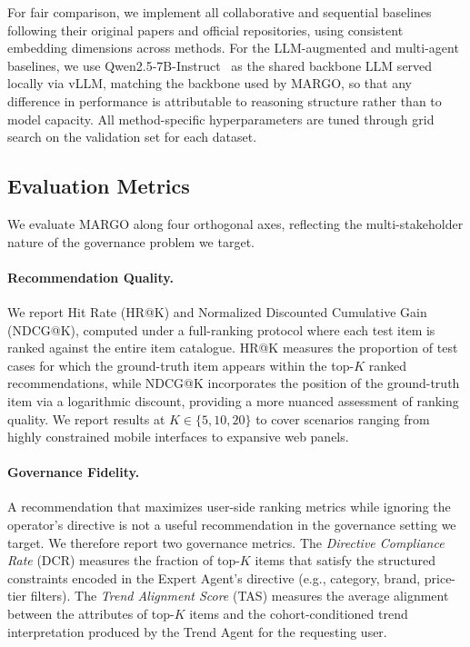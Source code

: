 \documentclass[master,english,final]{postech-ucs}
\begin{document}
For fair comparison, we implement all collaborative and sequential baselines following their original papers and official repositories, using consistent embedding dimensions across methods.
For the LLM-augmented and multi-agent baselines, we use Qwen2.5-7B-Instruct~\cite{qwen2024} as the shared backbone LLM served locally via vLLM, matching the backbone used by MARGO, so that any difference in performance is attributable to reasoning structure rather than to model capacity.
All method-specific hyperparameters are tuned through grid search on the validation set for each dataset.


\subsection{Evaluation Metrics}

We evaluate MARGO along four orthogonal axes, reflecting the multi-stakeholder nature of the governance problem we target.

\paragraph{Recommendation Quality.}
We report Hit Rate (HR@K) and Normalized Discounted Cumulative Gain (NDCG@K), computed under a full-ranking protocol where each test item is ranked against the entire item catalogue.
HR@K measures the proportion of test cases for which the ground-truth item appears within the top-$K$ ranked recommendations, while NDCG@K incorporates the position of the ground-truth item via a logarithmic discount, providing a more nuanced assessment of ranking quality.
We report results at $K \in \{5, 10, 20\}$ to cover scenarios ranging from highly constrained mobile interfaces to expansive web panels.

\paragraph{Governance Fidelity.}
A recommendation that maximizes user-side ranking metrics while ignoring the operator's directive is not a useful recommendation in the governance setting we target.
We therefore report two governance metrics.
The \emph{Directive Compliance Rate} (DCR) measures the fraction of top-$K$ items that satisfy the structured constraints encoded in the Expert Agent's directive (e.g., category, brand, price-tier filters).
The \emph{Trend Alignment Score} (TAS) measures the average alignment between the attributes of top-$K$ items and the cohort-conditioned trend interpretation produced by the Trend Agent for the requesting user.
\end{document}
